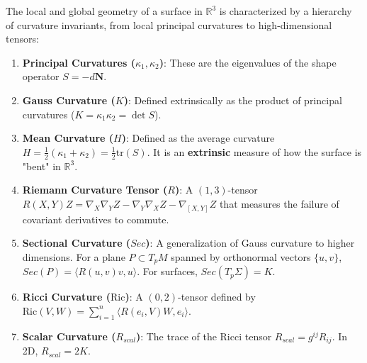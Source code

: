 \begin{remark}
The local and global geometry of a surface in $\mathbb{R}^3$ is characterized by a hierarchy of curvature invariants, from local principal curvatures to high-dimensional tensors:
\begin{enumerate}
    \item \textbf{Principal Curvatures ($\kappa_1, \kappa_2$)}: These are the eigenvalues of the shape operator $S = -d\mathbf{N}$. 
    \item \textbf{Gauss Curvature ($K$)}: Defined extrinsically as the product of principal curvatures ($K = \kappa_1 \kappa_2 = \det S$). 
    \item \textbf{Mean Curvature ($H$)}: Defined as the average curvature $H = \frac{1}{2}(\kappa_1 + \kappa_2) = \frac{1}{2} \text{tr}(S)$. It is an \textbf{extrinsic} measure of how the surface is "bent" in $\mathbb{R}^3$.
    \item \textbf{Riemann Curvature Tensor ($R$)}: A $(1,3)$-tensor $R(X, Y)Z = \nabla_X \nabla_Y Z - \nabla_Y \nabla_X Z - \nabla_{[X, Y]} Z$ that measures the failure of covariant derivatives to commute. 
    \item \textbf{Sectional Curvature ($Sec$)}: A generalization of Gauss curvature to higher dimensions. For a plane $P \subset T_p M$ spanned by orthonormal vectors $\{u, v\}$, $Sec(P) = \langle R(u, v)v, u \rangle$. For surfaces, $Sec(T_p \Sigma) = K$.
    \item \textbf{Ricci Curvature ($\mathrm{Ric}$)}: A $(0,2)$-tensor defined by $\mathrm{Ric}(V, W) = \sum_{i=1}^n \langle R(e_i, V)W, e_i \rangle$. 
    \item \textbf{Scalar Curvature ($R_{scal}$)}: The trace of the Ricci tensor $R_{scal} = g^{ij} R_{ij}$. In 2D, $R_{scal} = 2K$. 
\end{enumerate}


\end{remark}
